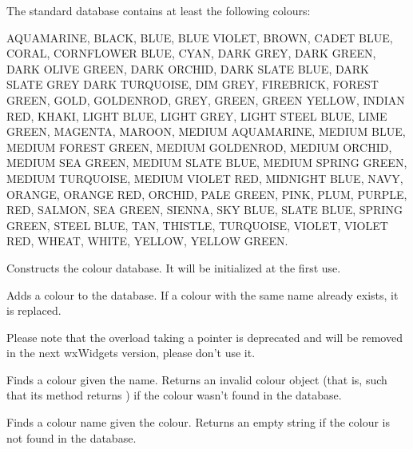 
The standard database contains at least the following colours:

AQUAMARINE, BLACK, BLUE, BLUE VIOLET, BROWN, CADET BLUE, CORAL,
CORNFLOWER BLUE, CYAN, DARK GREY, DARK GREEN, DARK OLIVE GREEN, DARK
ORCHID, DARK SLATE BLUE, DARK SLATE GREY DARK TURQUOISE, DIM GREY,
FIREBRICK, FOREST GREEN, GOLD, GOLDENROD, GREY, GREEN, GREEN YELLOW,
INDIAN RED, KHAKI, LIGHT BLUE, LIGHT GREY, LIGHT STEEL BLUE, LIME GREEN,
MAGENTA, MAROON, MEDIUM AQUAMARINE, MEDIUM BLUE, MEDIUM FOREST GREEN,
MEDIUM GOLDENROD, MEDIUM ORCHID, MEDIUM SEA GREEN, MEDIUM SLATE BLUE,
MEDIUM SPRING GREEN, MEDIUM TURQUOISE, MEDIUM VIOLET RED, MIDNIGHT BLUE,
NAVY, ORANGE, ORANGE RED, ORCHID, PALE GREEN, PINK, PLUM, PURPLE, RED,
SALMON, SEA GREEN, SIENNA, SKY BLUE, SLATE BLUE, SPRING GREEN, STEEL
BLUE, TAN, THISTLE, TURQUOISE, VIOLET, VIOLET RED, WHEAT, WHITE, YELLOW,
YELLOW GREEN.





\label{wxcolourdatabaseconstr}


Constructs the colour database. It will be initialized at the first use.


\label{wxcolourdatabaseaddcolour}



Adds a colour to the database. If a colour with the same name already exists,
it is replaced.

Please note that the overload taking a pointer is deprecated and will be
removed in the next wxWidgets version, please don't use it.


\label{wxcolourdatabasefind}


Finds a colour given the name. Returns an invalid colour object (that is, such
that its  method returns \false) if the colour wasn't
found in the database.


\label{wxcolourdatabasefindname}


Finds a colour name given the colour. Returns an empty string if the colour is
not found in the database.


